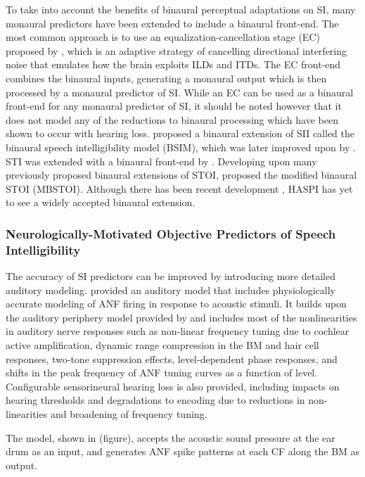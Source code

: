 To take into account the benefits of binaural perceptual adaptations on SI, many monaural predictors have been extended to include a binaural front-end. The most common approach is to use an equalization-cancellation stage (EC) proposed by \cite{durlach1960note}, which is an adaptive strategy of cancelling directional interfering noise that emulates how the brain exploits ILDs and ITDs. The EC front-end combines the binaural inputs, generating a monaural output which is then processed by a monaural predictor of SI. While an EC can be used as a binaural front-end for any monaural predictor of SI, it should be noted however that it does not model any of the reductions to binaural processing which have been shown to occur with hearing loss.  \cite{beutelmann2006prediction} proposed a binaural extension of SII called the binaural speech intelligibility model (BSIM), which was later improved upon by \cite{rennies2022joint}. STI was extended with a binaural front-end by \cite{van2008binaural}. Developing upon many previously proposed binaural extensions of STOI, \cite{andersen2018refinement} proposed the modified binaural STOI (MBSTOI). Although there has been recent development \citep{lavandier2023towards}, HASPI has yet to see a widely accepted binaural extension.

\subsubsection{Neurologically-Motivated Objective Predictors of Speech Intelligibility}

The accuracy of SI predictors can be improved by introducing more detailed auditory modeling. \cite{bruce2018phenomenological} provided an auditory model that includes physiologically accurate  modeling of ANF firing in response to acoustic stimuli. It builds upon the auditory periphery model provided by \cite{zilany2014updated} and includes most of the nonlinearities in auditory nerve responses such as non-linear frequency tuning due to cochlear active amplification, dynamic range compression in the BM and hair cell responses, two-tone suppression effects, level-dependent phase responses, and shifts in the peak frequency of ANF tuning curves as a function of level. Configurable sensorineural hearing loss is also provided, including impacts on hearing thresholds and degradations to encoding due to reductions in non-linearities and broadening of frequency tuning.

The model, shown in (figure), accepts the acoustic sound pressure at the ear drum as an input, and generates ANF spike patterns at each CF along the BM as output.

